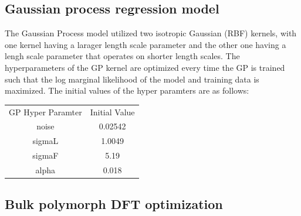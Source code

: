 \subsection{Gaussian process regression model}  %
%

%
The Gaussian Process model utilized two isotropic Gaussian (RBF) kernels, with one kernel having a larager length scale parameter and the other one having a lengh scale parameter that operates on shorter length scales.
%
The hyperparameters of the GP kernel are optimized every time the GP is trained such that the log marginal likelihood of the model and training data is maximized.
%
The initial values of the hyper paramters are as follows:

\begin{table}[htbp]
\centering
\begin{tabular}{cc}
  GP Hyper Paramter & Initial Value \\
  noise & 0.02542 \\
  sigmaL & 1.0049 \\
  sigmaF & 5.19 \\
  alpha & 0.018
\end{tabular}
\end{table}



\subsection{Bulk polymorph DFT optimization}  %
%

